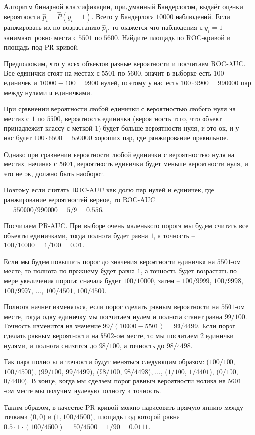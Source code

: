 \documentclass[12pt, a4paper, oneside]{article}
\theoremstyle{plain} %
\theoremstyle{definition}
\newcounter{problem}%
\renewcommand{\theproblem}{\arabic{problem}}
\newenvironment{problem}{
\addtocounter{problem}{1}\noindent{ \color{titleblue} \large \bfseries Упражнение~\theproblem \vspace{1ex} \newline}
}{ }
\begin{document}

\begin{problem}
Алгоритм бинарной классификации, придуманный Бандерлогом, выдаёт оценки вероятности $\hat p_i = \hat P(y_i=1)$. Всего у Бандерлога $10000$ наблюдений. Если ранжировать их по возрастанию $\hat p_i$, то окажется что наблюдения с $y_i = 1$ занимают ровно места с  $5501$ по $5600$. Найдите площадь по ROC-кривой и площадь под PR-кривой.
\end{problem}

\begin{solution} 

Предположим, что у всех объектов разные вероятности и посчитаем ROC-AUC. Все единички стоят на местах с \(5501\) по \(5600\), значит в выборке есть  \(100\) единичек и \(10000-100=9900\) нулей, поэтому у нас есть \(100 \cdot 9900=990000\) пар между нулями и единичками. 

При сравнении вероятности любой единички с вероятностью любого нуля на местах с \(1\) по \(5500\), вероятность единички (вероятность того, что объект принадлежит классу с меткой 1) будет больше вероятности нуля, и это ок, и у нас будет \(100 \cdot 5500=550000\) хороших пар, где ранжирование правильное. 

Однако при сравнении вероятности любой единички с вероятностью нуля на местах, начиная с \(5601\), вероятность единички будет меньше вероятности нуля, и это не ок, должно быть наоборот. 

Поэтому если считать ROC-AUC как долю пар нулей и единичек, где ранжирование вероятностей верное, то ROC-AUC\(=550000/990000=5/9=0.556\).

Посчитаем PR-AUC. При выборе очень маленького порога мы будем считать все объекты единичками, тогда полнота будет равна \(1\), а точность – \(100/10000=1/100=0.01\).

Если мы будем повышать порог до значения вероятности единички на \(5501\)-ом месте, то полнота по-прежнему будет равна \(1\), а точность будет возрастать по мере увеличения порога: сначала будет \(100/10000\), затем – \(100/9999\), \(100/9998\), \(100/9997\), ..., \(100/4501\), \(100/4500\). 

Полнота начнет изменяться, если порог сделать равным вероятности на \(5501\)-ом месте, тогда одну единичку мы посчитаем нулем и полнота станет равна \(99/100\). Точность изменится на значение \(99/(10000-5501)=99/4499\). Если порог сделать равным вероятности на \(5502\)-ом месте, то мы посчитаем 2 единички нулями, и полнота снизится до \(98/100\), а точность до \(98/4498\).

Так пара полноты и точности будут меняться следующим образом: (\(100/100\), \(100/4500\)), (\(99/100\), \(99/4499\)), (\(98/100\), \(98/4498\)), ..., \((1/100\), \(1/4401\)), (\(0/100\), \(0/4400\)). В конце, когда мы сделаем порог равным вероятности нолика на \(5601\)-ом месте мы получим нулевую полноту и точность.

Таким образом, в качестве PR-кривой можно нарисовать прямую линию между точками (\(0,0\)) и (\(1, 100/4500\)), площадь под которой равна \(0.5 \cdot1 \cdot  (100/4500)=50/4500=1/90=0.0111\).

\end{solution} 
\end{document}
